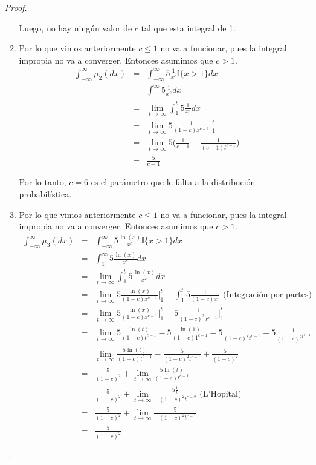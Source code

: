 \documentclass[paper=letter, fontsize=11pt]{scrartcl} %
\numberwithin{equation}{section} %
\numberwithin{figure}{section} %
\numberwithin{table}{section} %
\begin{document}
\begin{enumerate}[label = \Alph*)]
\begin{proof}
\begin{enumerate}[label = \arabic*)]
Luego, no hay ningún valor de $ c $ tal que esta integral de 1.
\item Por lo que vimos anteriormente $ c\leq1 $ no va a funcionar, pues la integral impropia no va a converger. Entonces asumimos que $ c > 1 $.
\begin{eqnarray}
\int_{-\infty}^{\infty}\mu_2(dx) &=& \int_{-\infty}^{\infty} 5\frac{1}{x^c}\mathbb{I}\{x>1\}dx \nonumber
\\ &=& \int_{1}^{\infty} 5\frac{1}{x^c}dx \nonumber
\\ &=& \lim_{t \to \infty} \int_{1}^{t} 5\frac{1}{x^c}dx \nonumber
\\ &=& \lim_{t \to \infty} 5\frac{1}{(1-c)x^{c-1}}\bigg |_{1}^t \nonumber
\\ &=& \lim_{t \to \infty} 5\big(\frac{1}{c-1}-\frac{1}{(c-1)t^{c-1}}\big) \nonumber
\\ &=& \frac{5}{c-1} \nonumber
\end{eqnarray}

Por lo tanto, $ c = 6 $ es el parámetro que le falta a la distribución probabilística.

\item Por lo que vimos anteriormente $ c\leq1 $ no va a funcionar, pues la integral impropia no va a converger. Entonces asumimos que $ c > 1 $.
\begin{eqnarray}
\int_{-\infty}^{\infty}\mu_3(dx) &=& \int_{-\infty}^{\infty} 5\frac{\ln(x)}{x^c}\mathbb{I}\{x>1\}dx \nonumber
\\ &=& \int_{1}^{\infty} 5\frac{\ln(x)}{x^c}dx \nonumber
\\ &=& \lim_{t \to \infty} \int_{1}^{t} 5\frac{\ln(x)}{x^c}dx \nonumber
\\ &=& \lim_{t \to \infty} 5\frac{\ln(x)}{(1-c)x^{c-1}}\bigg|_{1}^t - \int_{1}^{t} 5\frac{1}{(1-c)x^{c}} \nonumber \text{ (Integración por partes)}
\\ &=& \lim_{t \to \infty} 5\frac{\ln(x)}{(1-c)x^{c-1}}\bigg|_{1}^t - 5\frac{1}{(1-c)^2x^{c-1}} \bigg|_{1}^t \nonumber
\\ &=& \lim_{t \to \infty} 5\frac{\ln(t)}{(1-c)t^{c-1}}-5\frac{\ln(1)}{(1-c)1^{c-1}} - 5\frac{1}{(1-c)^2t^{c-1}}+5\frac{1}{(1-c)^21^{c-1}} \nonumber
\\ &=& \lim_{t \to \infty} \frac{5\ln(t)}{(1-c)t^{c-1}}- \frac{5}{(1-c)^2t^{c-1}}+\frac{5}{(1-c)^2} \nonumber
\\ &=& \frac{5}{(1-c)^2} +\lim_{t \to \infty} \frac{5\ln(t)}{(1-c)t^{c-1}}  \nonumber
\\ &=& \frac{5}{(1-c)^2} +\lim_{t \to \infty} \frac{5\frac{1}{t}}{-(1-c)^2t^{c-2}} \text{ (L'Hopital)} \nonumber
\\ &=& \frac{5}{(1-c)^2} +\lim_{t \to \infty} \frac{5}{-(1-c)^2t^{c-1}} \nonumber
\\ &=& \frac{5}{(1-c)^2} \nonumber
\end{eqnarray}



\end{enumerate}
\end{proof}
\end{enumerate}
\end{document}
